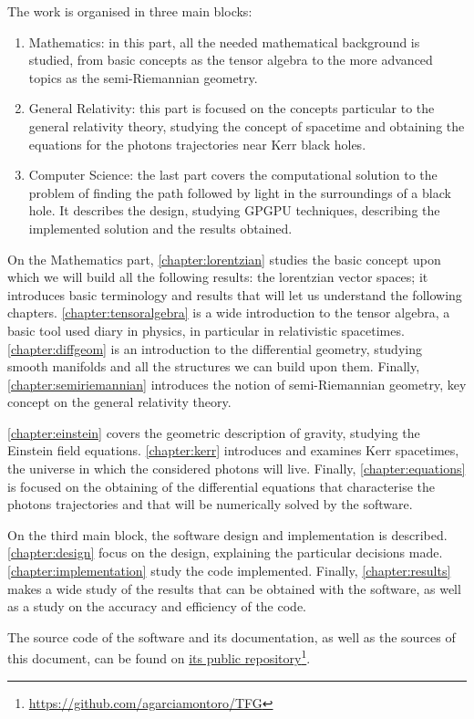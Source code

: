 The work is organised in three main blocks:
\begin{enumerate}
	\item Mathematics: in this part, all the needed mathematical background is studied, from basic concepts as the tensor algebra to the more advanced topics as the semi-Riemannian geometry.
	\item General Relativity: this part is focused on the concepts particular to the general relativity theory, studying the concept of spacetime and obtaining the equations for the photons trajectories near Kerr black holes.
	\item Computer Science: the last part covers the computational solution to the problem of finding the path followed by light in the surroundings of a black hole. It describes the design, studying \ac{GPGPU} techniques, describing the implemented solution and the results obtained.
\end{enumerate}

On the Mathematics part, \autoref{chapter:lorentzian} studies the basic concept upon which we will build all the following results: the lorentzian vector spaces; it introduces basic terminology and results that will let us understand the following chapters. \autoref{chapter:tensoralgebra} is a wide introduction to the tensor algebra, a basic tool used diary in physics, in particular in relativistic spacetimes. \autoref{chapter:diffgeom} is an introduction to the differential geometry, studying smooth manifolds and all the structures we can build upon them. Finally, \autoref{chapter:semiriemannian} introduces the notion of semi-Riemannian geometry, key concept on the general relativity theory.

\autoref{chapter:einstein} covers the geometric description of gravity, studying the Einstein field equations. \autoref{chapter:kerr} introduces and examines Kerr spacetimes, the universe in which the considered photons will live. Finally, \autoref{chapter:equations} is focused on the obtaining of the differential equations that characterise the photons trajectories and that will be numerically solved by the software.

On the third main block, the software design and implementation is described. \autoref{chapter:design} focus on the design, explaining the particular decisions made. \autoref{chapter:implementation} study the code implemented. Finally, \autoref{chapter:results} makes a wide study of the results that can be obtained with the software, as well as a study on the accuracy and efficiency of the code.

The source code of the software and its documentation, as well as the sources of this document, can be found on \href{https://github.com/agarciamontoro/TFG}{its public repository}\footnote{\url{https://github.com/agarciamontoro/TFG}}.